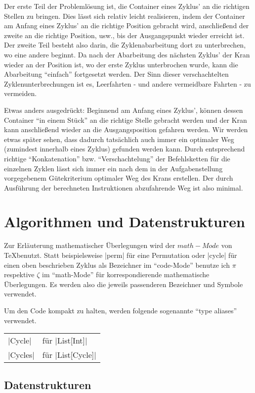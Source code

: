 Der erste Teil der Problemlösung ist, die Container eines Zyklus' an die richtigen Stellen zu bringen.
Dies lässt sich relativ leicht realisieren, indem der Container am Anfang eines Zyklus' an die richtige Position gebracht wird,
anschließend der zweite an die richtige Position, usw., bis der Ausgangspunkt wieder erreicht ist.
Der zweite Teil besteht also darin, die Zyklenabarbeitung dort zu unterbrechen, wo eine andere beginnt.
Da nach der Abarbeitung des nächsten Zyklus' der Kran wieder an der Position ist,
wo der erste Zyklus unterbrochen wurde, kann die Abarbeitung ``einfach'' fortgesetzt werden.
Der Sinn dieser verschachtelten Zyklenunterbrechungen ist es, Leerfahrten - und andere vermeidbare Fahrten - zu vermeiden.

Etwas anders ausgedrückt:
Beginnend am Anfang eines Zyklus', können dessen Container ``in einem Stück'' an die richtige Stelle gebracht werden
 und der Kran kann anschließend wieder an die Ausgangsposition gefahren werden.
Wir werden etwas später sehen, dass dadurch tatsächlich auch immer ein optimaler Weg (zumindest innerhalb eines Zyklus) gefunden werden kann.
Durch entsprechend richtige ``Konkatenation'' bzw. ``Verschachtelung'' der Befehlsketten für die einzelnen Zyklen lässt sich immer
 ein nach dem in der Aufgabenstellung vorgegebenem Gütekriterium optimaler Weg des Krans erstellen.
Der durch Ausführung der berechneten Instruktionen abzufahrende Weg ist also minimal.
\section{Algorithmen und Datenstrukturen}

Zur Erläuterung mathematischer Überlegungen wird der $math-Mode$ von \TeX benutzt.
Statt beispielsweise |perm| für eine Permutation oder |cycle| für einen oben beschrieben Zyklus als Bezeichner im ``code-Mode'' benutze ich $\pi$ respektive $\zeta$ im ``math-Mode''
 für korrespondierende mathematische Überlegungen.
Es werden also die jeweils passenderen Bezeichner und Symbole verwendet.

Um den Code kompakt zu halten, werden folgende sogenannte ``type aliases'' verwendet.

\begin{tabular}{ll}
 |Cycle|  & für |List[Int]| \\
 |Cycles| & für |List[Cycle]| \\
\end{tabular}
\subsection{Datenstrukturen}
